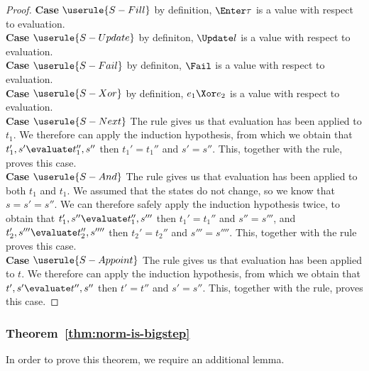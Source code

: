 \begin{proof}
  \noindent\textbf{Case} $\userule{S-Fill}$ by definition, $\Enter \tau$ is a
  value with respect to evaluation.\\

  \noindent\textbf{Case} $\userule{S-Update}$ by definiton, $\Update l$ is a
  value with respect to evaluation.\\

  \noindent\textbf{Case} $\userule{S-Fail}$ by definiton, $\Fail$ is a value
  with respect to evaluation.\\

  \noindent\textbf{Case} $\userule{S-Xor}$ by definition, $e_1\Xor e_2$ is a
  value with respect to evaluation.\\

  \noindent\textbf{Case} $\userule{S-Next}$ The  rule gives us
  that evaluation has been applied to $t_1$. We therefore can apply the
  induction hypothesis, from which we obtain that $t_1',s'\evaluate t_1'',s''$
  then $t_1'=t_1''$ and $s'=s''$. This, together with the  rule,
  proves this case.\\

  \noindent\textbf{Case} $\userule{S-And}$ The  rule gives us
  that evaluation has been applied to both $t_1$ and $t_1$. We assumed that the
  states do not change, so we know that $s=s'=s''$. We can therefore safely
  apply the induction hypothesis twice, to obtain that
  $t_1',s''\evaluate t_1'',s'''$ then $t_1'=t_1''$ and $s''=s'''$, and
  $t_2',s'''\evaluate t_2'',s''''$ then $t_2'=t_2''$ and $s'''=s''''$. This,
  together with the  rule proves this case.\\

  \noindent\textbf{Case} $\userule{S-Appoint}$ The  rule
  gives us that evaluation has been applied to $t$. We therefore can apply the
  induction hypothesis, from which we obtain that $t',s'\evaluate t'',s''$ then
  $t'=t''$ and $s'=s''$. This, together with the  rule,
  proves this case.

\end{proof}

\subsubsection{Theorem~\ref{thm:norm-is-bigstep}}

  In order to prove this theorem, we require an additional lemma.

